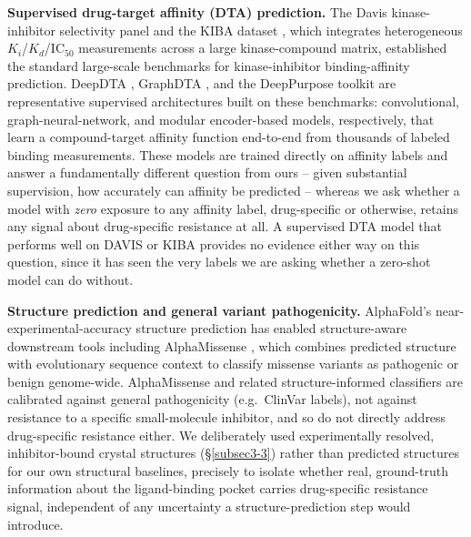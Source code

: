 \documentclass[pdflatex,sn-mathphys-num]{sn-jnl}%
\theoremstyle{thmstyleone}%
\theoremstyle{thmstyletwo}%
\theoremstyle{thmstylethree}%
\begin{document}
\textbf{Supervised drug-target affinity (DTA) prediction.} The Davis kinase-inhibitor selectivity panel \citep{Davis2011} and the KIBA dataset \citep{Tang2014}, which integrates heterogeneous $K_i$/$K_d$/IC$_{50}$ measurements across a large kinase-compound matrix, established the standard large-scale benchmarks for kinase-inhibitor binding-affinity prediction. DeepDTA \citep{Ozturk2018}, GraphDTA \citep{Nguyen2021}, and the DeepPurpose toolkit \citep{Huang2020} are representative supervised architectures built on these benchmarks: convolutional, graph-neural-network, and modular encoder-based models, respectively, that learn a compound-target affinity function end-to-end from thousands of labeled binding measurements. These models are trained directly on affinity labels and answer a fundamentally different question from ours -- given substantial supervision, how accurately can affinity be predicted -- whereas we ask whether a model with \emph{zero} exposure to any affinity label, drug-specific or otherwise, retains any signal about drug-specific resistance at all. A supervised DTA model that performs well on DAVIS or KIBA provides no evidence either way on this question, since it has seen the very labels we are asking whether a zero-shot model can do without.

\textbf{Structure prediction and general variant pathogenicity.} AlphaFold's near-experimental-accuracy structure prediction \citep{Jumper2021} has enabled structure-aware downstream tools including AlphaMissense \citep{Cheng2023}, which combines predicted structure with evolutionary sequence context to classify missense variants as pathogenic or benign genome-wide. AlphaMissense and related structure-informed classifiers are calibrated against general pathogenicity (e.g.\ ClinVar labels), not against resistance to a specific small-molecule inhibitor, and so do not directly address drug-specific resistance either. We deliberately used experimentally resolved, inhibitor-bound crystal structures (\S\ref{subsec3-3}) rather than predicted structures for our own structural baselines, precisely to isolate whether real, ground-truth information about the ligand-binding pocket carries drug-specific resistance signal, independent of any uncertainty a structure-prediction step would introduce.
\end{document}
